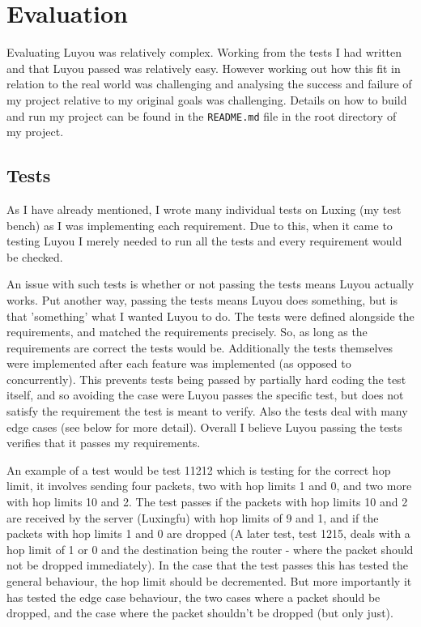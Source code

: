 \documentclass[12pt,a4paper,twoside,openright]{report}
\begin{document}
\chapter{Evaluation}

Evaluating Luyou was relatively complex. Working from the tests I had written and that Luyou passed was relatively easy.  However working out how this fit in relation to the real world was challenging and analysing the success and failure of my project relative to my original goals was challenging. Details on how to build and run my project can be found in the \verb!README.md! file in the root directory of my project. 

\section{Tests}

As I have already mentioned, I wrote many individual tests on Luxing (my test bench) as I was implementing each requirement.  Due to this, when it came to testing Luyou I merely needed to run all the tests and every requirement would be checked.

\bigskip

An issue with such tests is whether or not passing the tests means Luyou actually works. Put another way, passing the tests means Luyou does something, but is that 'something' what I wanted Luyou to do.  The tests were defined alongside the requirements, and matched the requirements precisely.  So, as long as the requirements are correct the tests would be.  Additionally the tests themselves were implemented after each feature was implemented (as opposed to concurrently).  This prevents tests being passed by partially hard coding the test itself, and so avoiding the case were Luyou passes the specific test, but does not satisfy the requirement the test is meant to verify. Also the tests deal with many edge cases (see below for more detail). Overall I believe Luyou passing the tests verifies that it passes my requirements.

\bigskip

An example of a test would be test 11212 which is testing for the correct hop limit, it involves sending four packets, two with hop limits 1 and 0, and two more with hop limits 10 and 2.  The test passes if the packets with hop limits 10 and 2 are received by the server (Luxingfu) with hop limits of 9 and 1, and if the packets with hop limits 1 and 0 are dropped (A later test, test 1215, deals with a hop limit of 1 or 0 and the destination being the router - where the packet should not be dropped immediately).  In the case that the test passes this has tested the general behaviour, the hop limit should be decremented. But more importantly it has tested the edge case behaviour, the two cases where a packet should be dropped, and the case where the packet shouldn't be dropped (but only just).
\end{document}
